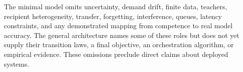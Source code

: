 The minimal model omits uncertainty, demand drift, finite data, teachers, recipient heterogeneity, transfer, forgetting, interference, queues, latency constraints, and any demonstrated mapping from competence to real model accuracy. The general architecture names some of these roles but does not yet supply their transition laws, a final objective, an orchestration algorithm, or empirical evidence. These omissions preclude direct claims about deployed systems.
